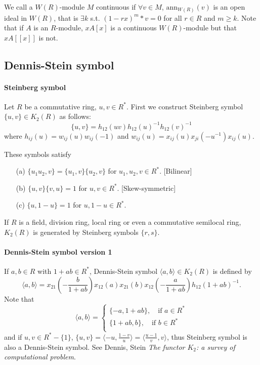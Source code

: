 We call a $W(R)$-module $M$ continuous if $\forall v \in M$, $\textrm{ann}_{W(R)}(v)$ is an open ideal in $W(R)$, that is $\exists k$ s.t. $(1-rx)^m *v =0$ for all $r\in R$ and $m\geqslant k$. Note that if $A$ is an $R$-module, $xA[x]$ is a continuous $W(R)$-module but that $xA[[x]]$ is not.

\subsection{Dennis-Stein symbol} %
\label{sub:dennis_stein_symbols}
\paragraph{Steinberg symbol} %
\label{par:steinberg_symbol}


Let $R$ be a commutative ring, $u,v\in R^*$. First we construct Steinberg symbol $\{u,v\}\in K_2(R)$ as follows:
\[\{u,v\}=h_{12}(uv)h_{12}(u)^{-1}h_12(v)^{-1}\]
where $h_{ij}(u)=w_{ij}(u)w_{ij}(-1)$ and $w_{ij}(u)=x_{ij}(u)x_{ji}(-u^{-1})x_{ij}(u)$.

These symbols satisfy
\begin{itemize}
	\item[(a)] $\{u_1u_2,v\}=\{u_1,v\}\{u_2,v\}$ for $u_1,u_2,v\in R^*$. [Bilinear]\\
	\item[(b)] $\{u,v\}\{v,u\}=1$ for $u,v \in R^*$. [Skew-symmetric]\\
	\item[(c)] $\{u,1-u\}=1$ for $u,1-u\in R^*$.
\end{itemize}
\begin{theorem}
	If $R$ is a field, division ring, local ring or even a commutative semilocal ring, $K_2(R)$ is generated by Steinberg symbols $\{r,s\}$.
\end{theorem}
\paragraph{Dennis-Stein symbol {\color{green}version 1}} %
\label{par:dennis_stein_symbol_greenversion_1}
If $a,b\in R$ with $1+ab \in R^*$, Dennis-Stein symbol $\langle a,b \rangle \in K_2(R)$ is defined by 
\[\langle a,b \rangle = x_{21}(-\frac{b}{1+ab})x_{12}(a)x_{21}(b)x_{12}(-\frac{a}{1+ab})h_{12}(1+ab)^{-1}.\]
Note that 
\[\langle a,b \rangle = \begin{cases}
	\{-a,1+ab\},\quad \mbox{if $a\in R^*$}\\
	\{1+ab,b\},\quad \mbox{if $b\in R^*$}\\
\end{cases}\]
and if $u,v\in R^*-\{1\}$, $\{u,v\}=\langle -u, \frac{1-v}{u} \rangle = \langle \frac{u-1}{v},v\rangle$, thus Steinberg symbol is also a Dennis-Stein symbol. See Dennis, Stein \emph{The functor $K_2$: a survey of computational problem}.

